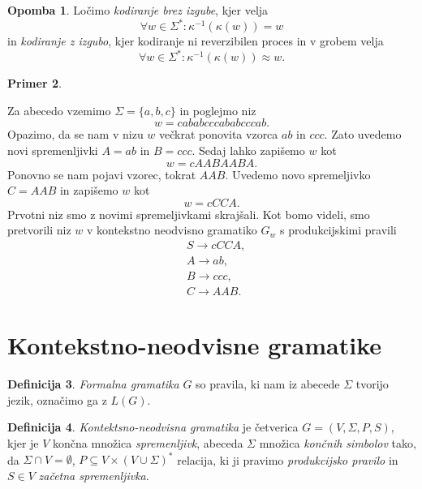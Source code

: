 \documentclass{amsart}
\theoremstyle{definition} %
\newtheorem{definicija}{Definicija}[section]
\newtheorem{primer}[definicija]{Primer}
\newtheorem{opomba}[definicija]{Opomba}
\theoremstyle{plain} %
\begin{document}
\begin{opomba}
    
    Ločimo \textit{kodiranje brez izgube}, kjer velja
    \[
        \forall w \in \Sigma^* \colon \kappa^{-1}(\kappa(w)) = w
    \]
    in \textit{kodiranje z izgubo}, kjer kodiranje ni reverzibilen proces
    in v grobem velja
    \[
        \forall w \in \Sigma^* \colon \kappa^{-1}(\kappa(w)) \approx w.
    \]

\end{opomba}

\begin{primer}\label{Stiskanje}
    
    Za abecedo vzemimo $ \Sigma = \{ a,b,c \} $ in poglejmo niz
    \[
        w = cababcccababcccab.
    \]
    Opazimo, da se nam v nizu $ w $ večkrat ponovita vzorca $ ab $ in $ ccc $. Zato
    uvedemo novi spremenljivki $ A = ab $ in $ B = ccc $. Sedaj lahko zapišemo $ w $ kot
    \[
        w = cAABAABA.
    \]
    Ponovno se nam pojavi vzorec, tokrat $ AAB $. Uvedemo novo spremeljivko $ C = AAB $
    in zapišemo $ w $ kot
    \[
        w = cCCA.
    \]
    Prvotni niz smo z novimi spremeljivkami skrajšali. Kot bomo videli, smo
    pretvorili niz $ w $ v kontekstno neodvisno gramatiko $ G_w $ s
    produkcijskimi pravili
    \begin{align*}
        & S  \rightarrow  cCCA, \\
        & A  \rightarrow  ab, \\
        & B  \rightarrow  ccc, \\
        & C  \rightarrow  AAB.
    \end{align*}

\end{primer}

\section{Kontekstno-neodvisne gramatike}

\begin{definicija}

    \textit{Formalna gramatika} $ G $ so pravila, ki nam iz abecede $ \Sigma $ tvorijo jezik,
    označimo ga z $ L(G) $.

\end{definicija}

\begin{definicija}

    \textit{Kontektsno-neodvisna gramatika} je četverica $ G = ( V, \Sigma, P, S ) $, kjer je
    $ V $ končna množica \textit{spremenljivk}, abeceda $ \Sigma $ množica \textit{končnih simbolov} tako,
    da $ \Sigma \cap V = \emptyset $, $ P \subseteq V \times ( V \cup \Sigma )^* $ relacija, ki ji
    pravimo \textit{produkcijsko pravilo} in $ S \in V $ \textit{začetna spremenljivka}.

\end{definicija}
\end{document}
